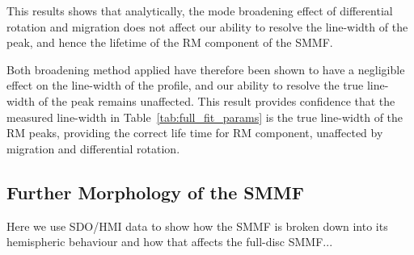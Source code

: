 This results shows that analytically, the mode broadening effect of differential rotation and migration does not affect our ability to resolve the line-width of the peak, and hence the lifetime of the RM component of the SMMF.

Both broadening method applied have therefore been shown to have a negligible effect on the line-width of the profile, and our ability to resolve the true line-width of the peak remains unaffected. This result provides confidence that the measured line-width in Table~\ref{tab:full_fit_params} is the true line-width of the RM peaks, providing the correct life time for RM component, unaffected by migration and differential rotation.





\subsection{Further Morphology of the SMMF}
\label{sec:SMMF_morphology}

Here we use SDO/HMI data to show how the SMMF is broken down into its hemispheric behaviour and how that affects the full-disc SMMF...



